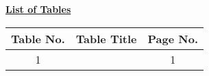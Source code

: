 \begingroup
\makeatletter

\pagestyle{plain}
\setlength{\parindent}{0pt}
\onehalfspacing
\fontsize{12pt}{14pt} \selectfont

\centerline{\Huge\bf\underline{List of Tables}}
\vspace{4pt}

\begin{table}[H]
    \centering
    \begin{tabular}{| c | c | c |}
        \hline
        {\bf Table No. } & {\bf Table Title } & {\bf Page No. }
        \\ \hline
        1 &  & 1
        \\ \hline
    \end{tabular}
\end{table}

%
\pagebreak

\endgroup
\makeatother
